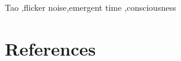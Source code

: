 \documentclass[review]{elsarticle}
\begin{document}



\begin{keyword}
Tao \sep flicker noise\sep emergent time \sep consciousness
\end{keyword}

\maketitle

\linenumbers






\section*{References}

\end{document}
